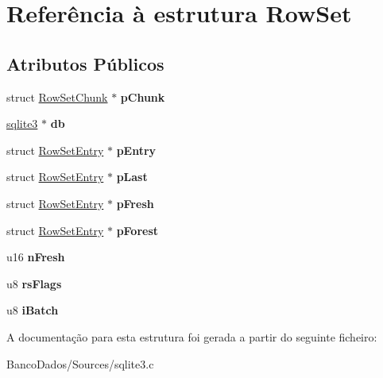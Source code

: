 \hypertarget{struct_row_set}{\section{Referência à estrutura Row\-Set}
\label{struct_row_set}
}
\subsection*{Atributos Públicos}
\begin{DoxyCompactItemize}
\item 
\hypertarget{struct_row_set_af064f9ec7b1ba820a3d53622bde9d42f}{struct \hyperlink{struct_row_set_chunk}{Row\-Set\-Chunk} $\ast$ {\bfseries p\-Chunk}}\label{struct_row_set_af064f9ec7b1ba820a3d53622bde9d42f}

\item 
\hypertarget{struct_row_set_a7da847a06c2f90025fbd89c57516c6f6}{\hyperlink{structsqlite3}{sqlite3} $\ast$ {\bfseries db}}\label{struct_row_set_a7da847a06c2f90025fbd89c57516c6f6}

\item 
\hypertarget{struct_row_set_a3eccaf69ad7863abae2541a7c0b94e1d}{struct \hyperlink{struct_row_set_entry}{Row\-Set\-Entry} $\ast$ {\bfseries p\-Entry}}\label{struct_row_set_a3eccaf69ad7863abae2541a7c0b94e1d}

\item 
\hypertarget{struct_row_set_a040c4b798e6f20d20aa99a45e93b2079}{struct \hyperlink{struct_row_set_entry}{Row\-Set\-Entry} $\ast$ {\bfseries p\-Last}}\label{struct_row_set_a040c4b798e6f20d20aa99a45e93b2079}

\item 
\hypertarget{struct_row_set_a7c4e95bd08ff77135068bb3987be5ca1}{struct \hyperlink{struct_row_set_entry}{Row\-Set\-Entry} $\ast$ {\bfseries p\-Fresh}}\label{struct_row_set_a7c4e95bd08ff77135068bb3987be5ca1}

\item 
\hypertarget{struct_row_set_abe7ab16fffbe5992f637d6a17c6342ff}{struct \hyperlink{struct_row_set_entry}{Row\-Set\-Entry} $\ast$ {\bfseries p\-Forest}}\label{struct_row_set_abe7ab16fffbe5992f637d6a17c6342ff}

\item 
\hypertarget{struct_row_set_a0ed2a47d6789a70081f3454ef2604e7f}{u16 {\bfseries n\-Fresh}}\label{struct_row_set_a0ed2a47d6789a70081f3454ef2604e7f}

\item 
\hypertarget{struct_row_set_af62438d96429ac10fcbddeb4f6bd9343}{u8 {\bfseries rs\-Flags}}\label{struct_row_set_af62438d96429ac10fcbddeb4f6bd9343}

\item 
\hypertarget{struct_row_set_af33d206290792936cb1ebbb8e03baf64}{u8 {\bfseries i\-Batch}}\label{struct_row_set_af33d206290792936cb1ebbb8e03baf64}

\end{DoxyCompactItemize}


A documentação para esta estrutura foi gerada a partir do seguinte ficheiro\-:\begin{DoxyCompactItemize}
\item 
Banco\-Dados/\-Sources/sqlite3.\-c\end{DoxyCompactItemize}
